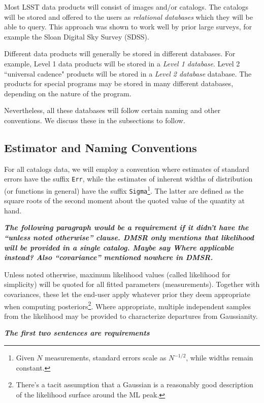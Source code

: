 \documentclass[12pt]{article}
\newcommand{\annotate}[1]{{\color{magenta}\large\textbf{\emph{#1}}}}
\begin{document}
Most LSST data products will consist of images and/or catalogs. The catalogs will be stored and offered to the users as {\em relational databases} which they will be able to query. This approach was shown to work well by prior large surveys, for example the Sloan Digital Sky Survey (SDSS).

Different data products will generally be stored in different databases. For example, Level 1 data products will be stored in a {\em Level 1 database}. Level 2 ``universal cadence" products will be stored in a {\em Level 2 database} database. The products for special programs may be stored in many different databases, depending on the nature of the program.

Nevertheless, all these databases will follow certain naming and other conventions. We discuss these in the subsections to follow.



\subsection{Estimator and Naming Conventions}

For all catalogs data, we will employ a convention where estimates of standard errors have the suffix {\tt Err}, while the estimates of inherent widths of distribution (or functions in general) have the suffix {\tt Sigma}\footnote{Given $N$ measurements, standard errors scale as $N^{-1/2}$, while widths remain constant.}. The latter are defined as the square roots of the second moment about the quoted value of the quantity at hand.

\annotate{The following paragraph would be a requirement if it didn't have the ``unless noted otherwise'' clause. DMSR only mentions that likelihood will be provided in a single catalog. Maybe say \emph{Where applicable} instead? Also ``covariance'' mentioned nowhere in DMSR.}

Unless noted otherwise, maximum likelihood values (called likelihood for simplicity) will be quoted for all fitted parameters (measurements). Together with covariances, these let the end-user apply whatever prior they deem appropriate when computing posteriors\footnote{There's a tacit assumption that a Gaussian is a reasonably good description of the likelihood surface around the ML peak.}. Where appropriate, multiple independent samples from the likelihood may be provided to characterize departures from Gaussianity.

\annotate{The first two sentences are requirements}
\end{document}
